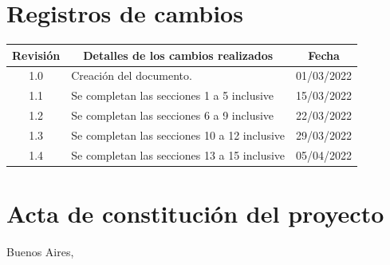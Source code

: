 \documentclass[
11pt, %
]{charter}
\begin{document}
\maketitle
\thispagestyle{empty}
\pagebreak


\thispagestyle{empty}
{\setlength{\parskip}{0pt}
\tableofcontents{}
}
\pagebreak


\section*{Registros de cambios}
\label{sec:registro}


\begin{table}[ht]
\label{tab:registro}
\centering
\begin{tabularx}{\linewidth}{@{}|c|X|c|@{}}
\hline
\rowcolor[HTML]{C0C0C0} 
Revisión & \multicolumn{1}{c|}{\cellcolor[HTML]{C0C0C0}Detalles de los cambios realizados} & Fecha      \\ \hline
1.0	& Creación del documento.				& 01/03/2022 \\ \hline
1.1	& Se completan las secciones 1 a 5 inclusive		& 15/03/2022 \\ \hline
1.2	& Se completan las secciones 6 a 9 inclusive                & 22/03/2022 \\ \hline
1.3     & Se completan las secciones 10 a 12 inclusive		& 29/03/2022 \\ \hline
1.4	& Se completan las secciones 13 a 15 inclusive		& 05/04/2022 \\ \hline
\end{tabularx}
\end{table}

\pagebreak



\section*{Acta de constitución del proyecto}
\label{sec:acta}

\begin{flushright}
Buenos Aires, \fechaInicioName
\end{flushright}
\end{document}
